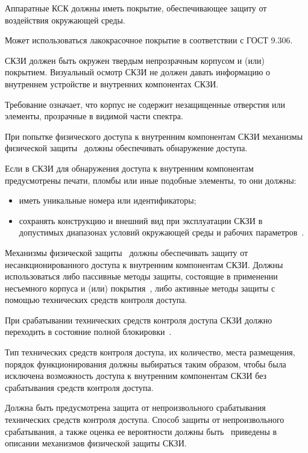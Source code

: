 \label{R.PS.Passivation}
Аппаратные КСК должны иметь покрытие, обеспечивающее защиту от воздействия 
окружающей среды. 

\begin{note}
Может использоваться лакокрасочное покрытие в соответствии с ГОСТ 9.306.
\end{note}


\label{R.PS.Coating}
СКЗИ должен быть окружен твердым непрозрачным корпусом и (или) покрытием.
%
Визуальный осмотр СКЗИ не должен давать информацию о внутреннем устройстве 
и внутренних компонентах СКЗИ.

\begin{note}
Требование означает, что корпус не содержит незащищенные отверстия
или элементы, прозрачные в видимой части спектра. 
\end{note}


\label{R.PS.PassiveDetection}
При попытке физического доступа к внутренним компонентам СКЗИ механизмы 
физической защиты~ должны обеспечивать обнаружение доступа. 

\label{R.PS.PassiveDetectionId}
Если в СКЗИ для обнаружения доступа к внутренним компонентам предусмотрены 
печати, пломбы или иные подобные элементы, то они должны:
\begin{itemize}
\item
иметь уникальные номера или идентификаторы;
\item
сохранять конструкцию и внешний вид при эксплуатации СКЗИ в допустимых 
диапазонах условий окружающей среды и рабочих параметров~. 
\end{itemize}


\label{R.PS.ActiveDetectionSensor}
Механизмы физической защиты~ должны обеспечивать 
защиту от несанкционированного доступа к внутренним компонентам
СКЗИ. 
%
Должны использоваться либо пассивные методы защиты, состоящие в применении 
несъемного корпуса и (или) покрытия~, либо 
активные методы защиты с помощью технических средств контроля доступа.

\label{R.PS.Erasing}
При срабатывании технических средств контроля доступа СКЗИ должно 
переходить в состояние полной блокировки~.

\label{R.PS.SensorsQuality}
Тип технических средств контроля доступа, их количество, места 
размещения, порядок функционирования должны выбираться таким образом, 
чтобы была исключена возможность доступа к внутренним компонентам СКЗИ 
без срабатывания средств контроля доступа.  

\label{R.PS.SensorsFaults}
Должна быть предусмотрена защита от непроизвольного срабатывания технических 
средств контроля доступа. Способ защиты от непроизвольного срабатывания, 
а также оценка ее вероятности должны быть~ 
приведены в описании механизмов физической защиты СКЗИ.
